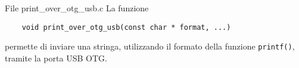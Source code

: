 \begin{frame}[fragile]{File print\_over\_otg\_usb.c}
  La funzione
  \begin{lstlisting}
    void print_over_otg_usb(const char * format, ...)
  \end{lstlisting}
  permette di inviare una stringa, utilizzando il formato della funzione \lstinline!printf()!, tramite la porta USB OTG.
\end{frame}


